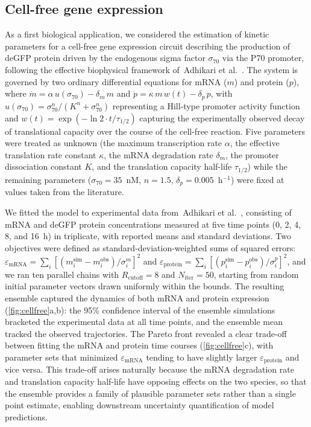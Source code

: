 \documentclass[preprint,review,12pt]{elsarticle}
\begin{document}
\subsection{Cell-free gene expression}\label{sec:cellfree}
As a first biological application, we considered the estimation of kinetic parameters for a cell-free gene expression circuit describing the production of deGFP protein driven by the endogenous sigma factor $\sigma_{70}$ via the P70 promoter, following the effective biophysical framework of~Adhikari et al.~\cite{Adhikari2020}.
The system is governed by two ordinary differential equations for mRNA ($m$) and protein ($p$), where $\dot{m} = \alpha\, u(\sigma_{70}) - \delta_m\, m$ and $\dot{p} = \kappa\, m\, w(t) - \delta_p\, p$, with $u(\sigma_{70}) = \sigma_{70}^{n}/(K^n + \sigma_{70}^n)$ representing a Hill-type promoter activity function and $w(t) = \exp(-\ln 2 \cdot t / \tau_{1/2})$ capturing the experimentally observed decay of translational capacity over the course of the cell-free reaction.
Five parameters were treated as unknown (the maximum transcription rate $\alpha$, the effective translation rate constant $\kappa$, the mRNA degradation rate $\delta_m$, the promoter dissociation constant $K$, and the translation capacity half-life $\tau_{1/2}$) while the remaining parameters ($\sigma_{70} = 35$~nM, $n = 1.5$, $\delta_p = 0.005$~h$^{-1}$) were fixed at values taken from the literature.

We fitted the model to experimental data from~Adhikari et al.~\cite{Adhikari2020}, consisting of mRNA and deGFP protein concentrations measured at five time points (0, 2, 4, 8, and 16~h) in triplicate, with reported means and standard deviations.
Two objectives were defined as standard-deviation-weighted sums of squared errors: $\varepsilon_{\text{mRNA}} = \sum_i [(m_i^{\text{sim}} - m_i^{\text{obs}}) / \sigma_i^m]^2$ and $\varepsilon_{\text{protein}} = \sum_i [(p_i^{\text{sim}} - p_i^{\text{obs}}) / \sigma_i^p]^2$, and we ran ten parallel chains with $R_{\text{cutoff}} = 8$ and $N_{\text{iter}} = 50$, starting from random initial parameter vectors drawn uniformly within the bounds.
The resulting ensemble captured the dynamics of both mRNA and protein expression (\cref{fig:cellfree}a,b): the 95\% confidence interval of the ensemble simulations bracketed the experimental data at all time points, and the ensemble mean tracked the observed trajectories.
The Pareto front revealed a clear trade-off between fitting the mRNA and protein time courses (\cref{fig:cellfree}c), with parameter sets that minimized $\varepsilon_{\text{mRNA}}$ tending to have slightly larger $\varepsilon_{\text{protein}}$ and vice versa. This trade-off arises naturally because the mRNA degradation rate and translation capacity half-life have opposing effects on the two species, so that the ensemble provides a family of plausible parameter sets rather than a single point estimate, enabling downstream uncertainty quantification of model predictions.
\end{document}

